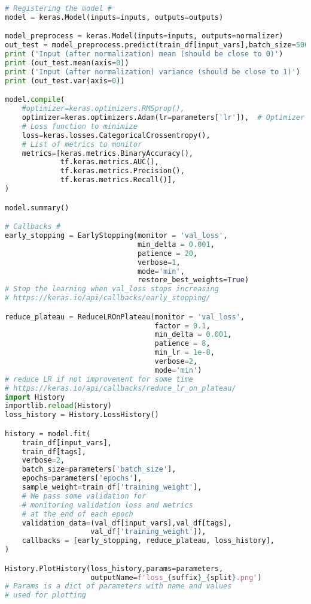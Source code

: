 \begin{lstlisting}[language=Python, caption=DNN setup for the \wwgg semi-leptonic final state, label={dnncode}]
# Registering the model #
model = keras.Model(inputs=inputs, outputs=outputs)

model_preprocess = keras.Model(inputs=inputs, outputs=normalizer)
out_test = model_preprocess.predict(train_df[input_vars],batch_size=5000)
print ('Input (after normalization) mean (should be close to 0)')
print (out_test.mean(axis=0))
print ('Input (after normalization) variance (should be close to 1)')
print (out_test.var(axis=0))

model.compile(
    #optimizer=keras.optimizers.RMSprop(),
    optimizer=keras.optimizers.Adam(lr=parameters['lr']),  # Optimizer
    # Loss function to minimize
    loss=keras.losses.CategoricalCrossentropy(),
    # List of metrics to monitor
    metrics=[keras.metrics.BinaryAccuracy(),
             tf.keras.metrics.AUC(),
             tf.keras.metrics.Precision(),
             tf.keras.metrics.Recall()],
)

model.summary()

# Callbacks #
early_stopping = EarlyStopping(monitor = 'val_loss',
                               min_delta = 0.001, 
                               patience = 20,
                               verbose=1,
                               mode='min',
                               restore_best_weights=True)
# Stop the learning when val_loss stops increasing 
# https://keras.io/api/callbacks/early_stopping/

reduce_plateau = ReduceLROnPlateau(monitor = 'val_loss',
                                   factor = 0.1,
                                   min_delta = 0.001, 
                                   patience = 8,
                                   min_lr = 1e-8,
                                   verbose=2,
                                   mode='min')
# reduce LR if not improvement for some time 
# https://keras.io/api/callbacks/reduce_lr_on_plateau/
import History 
importlib.reload(History)
loss_history = History.LossHistory()

history = model.fit(
    train_df[input_vars],
    train_df[tags],
    verbose=2,
    batch_size=parameters['batch_size'],
    epochs=parameters['epochs'],
    sample_weight=train_df['training_weight'],
    # We pass some validation for
    # monitoring validation loss and metrics
    # at the end of each epoch
    validation_data=(val_df[input_vars],val_df[tags],
                    val_df['training_weight']),
    callbacks = [early_stopping, reduce_plateau, loss_history],
)

History.PlotHistory(loss_history,params=parameters,
                    outputName=f'loss_{suffix}_{split}.png')
# Params is a dict of parameters with name and values
# used for plotting


\end{lstlisting}

